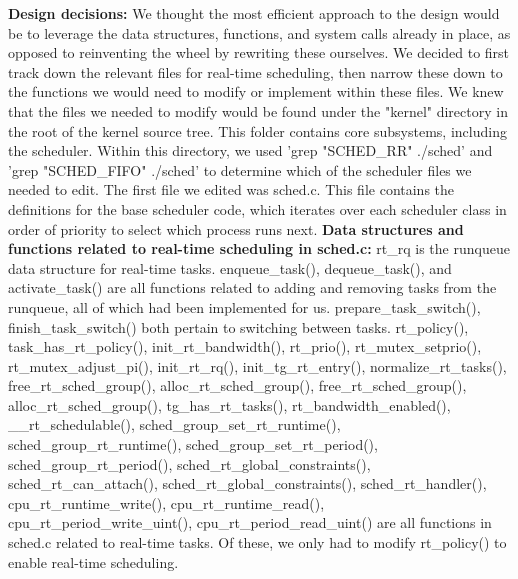 \documentclass[letterpaper,10pt,titlepage]{article}
\newcommand{\ignore}[2]{\hspace{0in}#2} %
\newcommand{\tab}{\hspace*{2em}} %
\begin{document}
\begin{enumerate}
\tab \textbf{Design decisions:} We thought the most efficient approach to the design would be to leverage the data structures, functions, and system calls already in place, as opposed to reinventing the wheel by rewriting these ourselves. We decided to first track down the relevant files for real-time scheduling, then narrow these down to the functions we would need to modify or implement within these files. We knew that the files we needed to modify would be found under the "kernel" directory in the root of the kernel source tree. This folder contains core subsystems, including the scheduler. Within this directory, we used 'grep "SCHED\_RR" ./sched\*' and 'grep "SCHED\_FIFO" ./sched\*' to determine which of the scheduler files we needed to edit. The first file we edited was sched.c. This file contains the definitions for the base scheduler code, which iterates over each scheduler class in order of priority to select which process runs next. \ignore{[Linux Kernel Development, pg. 47]}

\tab \textbf{Data structures and functions related to real-time scheduling in sched.c:} rt\_rq is the runqueue data structure for real-time tasks. enqueue\_task(), dequeue\_task(), and activate\_task() are all functions related to adding and removing tasks from the runqueue, all of which had been implemented for us. prepare\_task\_switch(), finish\_task\_switch() both pertain to switching between tasks. rt\_policy(), task\_has\_rt\_policy(), init\_rt\_bandwidth(), rt\_prio(), rt\_mutex\_setprio(), rt\_mutex\_adjust\_pi(), init\_rt\_rq(), init\_tg\_rt\_entry(), normalize\_rt\_tasks(), free\_rt\_sched\_group(), alloc\_rt\_sched\_group(), free\_rt\_sched\_group(), alloc\_rt\_sched\_group(), tg\_has\_rt\_tasks(), rt\_bandwidth\_enabled(), \_\_rt\_schedulable(), sched\_group\_set\_rt\_runtime(), sched\_group\_rt\_runtime(), sched\_group\_set\_rt\_period(), sched\_group\_rt\_period(), sched\_rt\_global\_constraints(), sched\_rt\_can\_attach(), sched\_rt\_global\_constraints(), sched\_rt\_handler(), cpu\_rt\_runtime\_write(), cpu\_rt\_runtime\_read(), cpu\_rt\_period\_write\_uint(), cpu\_rt\_period\_read\_uint() are all functions in sched.c related to real-time tasks. Of these, we only had to modify rt\_policy() to enable real-time scheduling.


\end{enumerate}
\end{document}
